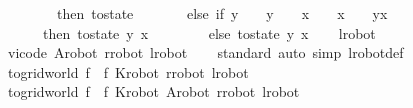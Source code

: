\begin{isabellebody}
\ \ \ \ \ \ \ \ then\ to{\isacharunderscore}{\kern0pt}state\ {\isacharparenleft}{\kern0pt}{}{\isacharcomma}{\kern0pt}{}{\isacharparenright}{\kern0pt}\isanewline
\ \ \ \ \ \ else\ if\ y{\isacharprime}{\kern0pt}\ {\isacharless}{\kern0pt}\ {}\ {\isasymor}\ y{\isacharprime}{\kern0pt}\ {\isachargreater}{\kern0pt}\ {}\ {\isasymor}\ x{\isacharprime}{\kern0pt}\ {\isacharless}{\kern0pt}\ {}\ {\isasymor}\ x{\isacharprime}{\kern0pt}\ {\isachargreater}{\kern0pt}\ {}\ {\isasymor}\ {\isacharparenleft}{\kern0pt}y{\isacharprime}{\kern0pt}{\isacharcomma}{\kern0pt}x{\isacharprime}{\kern0pt}{\isacharparenright}{\kern0pt}\ {\isacharequal}{\kern0pt}\ {\isacharparenleft}{\kern0pt}{}{\isacharcomma}{\kern0pt}{}{\isacharparenright}{\kern0pt}\isanewline
\ \ \ \ \ \ then\ to{\isacharunderscore}{\kern0pt}state\ {\isacharparenleft}{\kern0pt}y{\isacharcomma}{\kern0pt}\ x{\isacharparenright}{\kern0pt}\isanewline
\ \ \ \ \ \ \ \ else\ to{\isacharunderscore}{\kern0pt}state\ {\isacharparenleft}{\kern0pt}y{\isacharprime}{\kern0pt}{\isacharcomma}{\kern0pt}\ x{\isacharprime}{\kern0pt}{\isacharparenright}{\kern0pt}{\isacharparenright}{\kern0pt}\isanewline
\ \ {\isacharbraceright}{\kern0pt}{\isachardoublequoteclose}\isanewline
\isanewline
{}\isamarkupfalse%
\ {\isachardoublequoteopen}l{\isacharunderscore}{\kern0pt}robot\ {\isacharequal}{\kern0pt}\ {}{\isachardot}{\kern0pt}{}{\isachardoublequoteclose}\isanewline
\isanewline
{}\isamarkupfalse%
\ {\isachardoublequoteopen}vi{\isacharunderscore}{\kern0pt}code\ A{\isacharunderscore}{\kern0pt}robot\ r{\isacharunderscore}{\kern0pt}robot\ l{\isacharunderscore}{\kern0pt}robot{\isachardoublequoteclose}\isanewline
%
\isadelimproof
\ \ %
\endisadelimproof
%
\isatagproof
{}\isamarkupfalse%
\ standard\ {\isacharparenleft}{\kern0pt}auto\ simp{\isacharcolon}{\kern0pt}\ l{\isacharunderscore}{\kern0pt}robot{\isacharunderscore}{\kern0pt}def{\isacharparenright}{\kern0pt}%
\endisatagproof
{\isafoldproof}%
%
\isadelimproof
\isanewline
%
\endisadelimproof
\isanewline
\isanewline
{}\isamarkupfalse%
\ {\isachardoublequoteopen}to{\isacharunderscore}{\kern0pt}gridworld\ f\ {\isasymequiv}\ f\ K{\isacharunderscore}{\kern0pt}robot\ r{\isacharunderscore}{\kern0pt}robot\ l{\isacharunderscore}{\kern0pt}robot{\isachardoublequoteclose}\isanewline
{}\isamarkupfalse%
\ {\isachardoublequoteopen}to{\isacharunderscore}{\kern0pt}gridworld{\isacharprime}{\kern0pt}\ f\ {\isasymequiv}\ f\ K{\isacharunderscore}{\kern0pt}robot\ A{\isacharunderscore}{\kern0pt}robot\ r{\isacharunderscore}{\kern0pt}robot\ l{\isacharunderscore}{\kern0pt}robot{\isachardoublequoteclose}\isanewline

\end{isabellebody}
